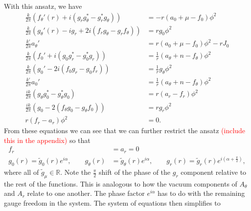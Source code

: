     With this ansatz, we have
    \begin{align}
        \frac{k}{2\pi} \left(f_{\theta}'(r) +i \left(g_r g_{\theta}^* - g_r^* g_{\theta} \right) \right) &= -r \left(a_0 +\mu - f_0 \right)\phi^2 \\
        \frac{k}{2 \pi} \left(g_{\theta}'(r) - i g_r +2i \left(f_r g_{\theta} -g_r f_{\theta} \right) \right) &=r g_0 \phi^2 \\
        \frac{k'}{2\pi} a_{\theta}' &= r \left(a_0 + \mu -f_0\right)\phi^2 -r J_0\\
        \frac{k}{2\pi} \left(f_0' + i \left(g_0 g_r^* - g_0^* g_r\right)\right)&= \frac{1}{r} \left(a_{\theta} + n - f_{\theta}\right)\phi^2\\
        \frac{k}{2\pi} \left(g_0' - 2i \left(f_0 g_r - g_0 f_r \right)\right) &= \frac{1}{r} g_{\theta} \phi^2\\
        \frac{k'}{2\pi} a_0' &=\frac{1}{r} \left(a_{\theta} +n - f_{\theta}\right) \phi^2 \\
        \frac{i k}{2\pi} \left(g_{\theta}g_0^* - g_{\theta}^* g_0\right) &= r \left(a_r -f_r\right) \phi^2 \\
        \frac{i k}{2\pi} \left(  g_0 - 2 \left(f_{\theta} g_0 - g_{\theta} f_0 \right)\right) &= r g_r \phi^2\\
        r \left(f_r -a_r\right) \phi^2 &= 0.
    \end{align}
    From these equations we can see that we can further restrict the ansatz \textcolor{red}{(include this in the appendix)} so that
    \begin{align}
        f_r &=a_r = 0 \\
        g_0(r) = \tilde{g}_0(r) e^{i \alpha}, \qquad g_{\theta}(r) &= \tilde{g}_{\theta}(r) e^{i \alpha}, \qquad g_r(r) =  \tilde{g}_r(r) e^{i \left(\alpha + \frac{\pi}{2} \right)},
    \end{align}
    where all of $\tilde{g}_{\mu} \in \mathbb{R}$. Note the $\frac{\pi}{2}$ shift of the phase of the $g_r$ component relative to the rest of the functions. This is analogous to how the vacuum components of $A_{\theta}$ and $A_r$ relate to one another. The phase factor $e^{i \alpha}$ has to do with the remaining gauge freedom in the system.
    The system of equations then simplifies to
